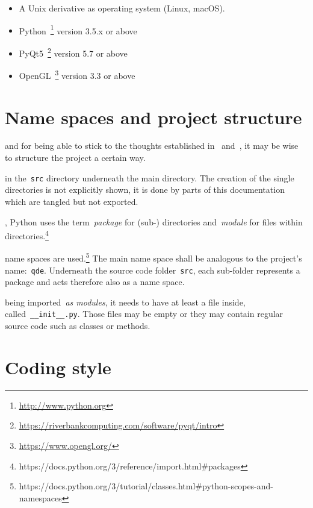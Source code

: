 \documentclass[%
    a4paper,    %
    justified,  %
    nobib,      %
    openany     %
]{tufte-book}
\begin{document}
\begin{itemize}
  \item A Unix derivative as operating system (Linux, macOS).
  \item Python~\footnote{\url{http://www.python.org}} version 3.5.x or above
  \item PyQt5~\footnote{%
      \url{https://riverbankcomputing.com/software/pyqt/intro}} version 5.7 or
    above
  \item OpenGL~\footnote{\url{https://www.opengl.org/}} version 3.3 or above
\end{itemize}%

\section{Name spaces and project structure}
\label{appendix:sec:name-spaces}

 and for being able to
stick to the thoughts established in~
and~, it may be wise to structure the project a
certain way.

 in the~\verb+src+ directory
underneath the main directory. The creation of the single directories is not
explicitly shown, it is done by parts of this documentation which are tangled
but not exported.

, Python uses the
term~\emph{package} for (sub-) directories and~\emph{module} for files within
directories.\footnote{https://docs.python.org/3/reference/import.html\#packages}

 name
spaces are
used.\footnote{https://docs.python.org/3/tutorial/classes.html\#python-scopes-and-namespaces}
The main name space shall be analogous to the project's name:~\verb+qde+.
Underneath the source code folder~\verb+src+, each sub-folder represents a
package and acts therefore also as a name space.

 being
imported~\emph{as modules}, it needs to have at least a file inside,
called~\verb+__init__.py+. Those files may be empty or they may contain
regular source code such as classes or methods.

\section{Coding style}
\label{appendix:sec:coding-style}
\end{document}
